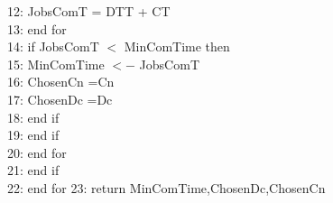 \documentclass[12pt,a4paper]{report}
\begin{document}
12: \hspace{0.4 in}JobsComT = DTT + CT \\
13: \hspace{0.3 in}end for \\
14: \hspace{0.3 in}if JobsComT $<$ MinComTime then\\
 15:\hspace{0.4 in} MinComTime $<-$ JobsComT \\
16: \hspace{0.4 in}ChosenCn =Cn \\
17: \hspace{0.4 in}ChosenDc =Dc \\
18: \hspace{0.3 in}end if \\
19: \hspace{0.2 in}end if \\
20: \hspace{0.1 in}end for\\
 21:\hspace{0.1 in} end if \\
22: end for 
23: return MinComTime,ChosenDc,ChosenCn


\newpage
\end{document}
